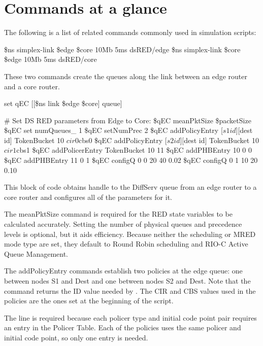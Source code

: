 \section{Commands at a glance}
\label{sec:diffservcommand}

The following is a list of related commands commonly used in
  simulation scripts:

\begin{program}
\$ns simplex-link \$edge \$core 10Mb 5ms dsRED/edge
\$ns simplex-link \$core \$edge 10Mb 5ms dsRED/core
\end{program}

These two commands create the queues along 
  the link between an edge router and a core router.

\begin{program}
set qEC [[\$ns link \$edge \$core] queue]

# Set DS RED parameters from Edge to Core:
\$qEC meanPktSize \$packetSize
\$qEC set numQueues_ 1
\$qEC setNumPrec 2
\$qEC addPolicyEntry [$s1 id] [$dest id] TokenBucket 10 $cir0 $cbs0
\$qEC addPolicyEntry [$s2 id] [$dest id] TokenBucket 10 $cir1 $cbs1
\$qEC addPolicerEntry TokenBucket 10 11
\$qEC addPHBEntry 10 0 0
\$qEC addPHBEntry 11 0 1
\$qEC configQ 0 0 20 40 0.02
\$qEC configQ 0 1 10 20 0.10
\end{program}

This block of code obtains handle to the DiffServ queue 
  from an edge router to a core router and 
  configures all of the parameters for it.

The meanPktSize command is required for the RED state variables to be 
  calculated accurately.  
Setting the number of physical queues and precedence levels is optional, 
  but it aids efficiency. 
Because neither the scheduling or MRED mode type are set, 
  they default to Round Robin scheduling and RIO-C Active Queue Management.

The addPolicyEntry commands establish two policies at the edge queue: 
  one between nodes S1 and Dest and one between nodes S2 and Dest.  
Note that the \code{[$s1 id]} command returns the ID value 
  needed by .  
The CIR and CBS values used in the policies are the ones set at 
  the beginning of the script.

The  line is required 
  because each policer type and initial code point pair requires 
  an entry in the Policer Table.  
Each of the policies uses the same policer and initial code point, 
  so only one entry is needed.

